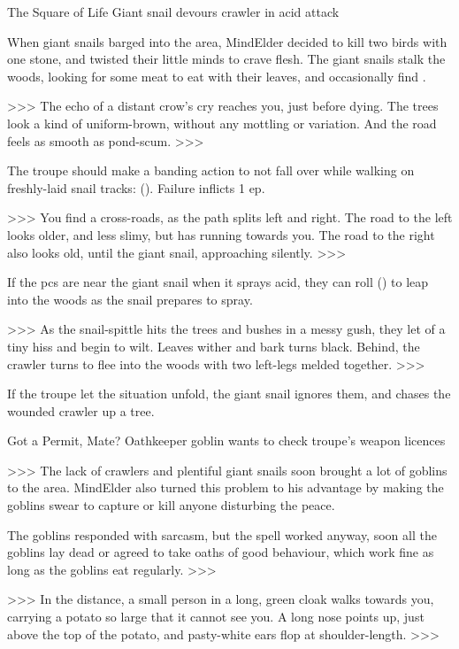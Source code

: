 

{The Square of Life}%
{Giant snail devours \gls{crawler} in acid attack}%

When giant snails barged into the area, \gls{MindElder} decided to kill two birds with one stone, and twisted their little minds to crave flesh.
The giant snails stalk the woods, looking for some meat to eat with their leaves, and occasionally find .

>>>
The echo of a distant crow's cry reaches you, just before dying.
The trees look a kind of uniform-brown, without any mottling or variation.
And the road feels as smooth as pond-scum.
>>>

The troupe should make a banding action to not fall over while walking on freshly-laid snail tracks:  (\tn[7]).
Failure inflicts 1 \gls{ep}.

>>>
You find a cross-roads, as the path splits left and right.
The road to the left looks older, and less slimy, but has  running towards you.
The road to the right also looks old, until the giant snail, approaching silently.
>>>

If the \glspl{pc}  are near the giant snail when it sprays acid, they can roll  (\tn[7]) to leap into the woods as the snail prepares to spray.

>>>
As the snail-spittle hits the trees and bushes in a messy gush, they let of a tiny hiss and begin to wilt.
Leaves wither and bark turns black.
Behind, the \gls{crawler} turns to flee into the woods with two left-legs melded together.
>>>

If the troupe let the situation unfold, the giant snail ignores them, and chases the wounded \gls{crawler} up a tree.


{Got a Permit, Mate?}%
{Oathkeeper goblin wants to check troupe's weapon licences}%

>>>
The lack of \glspl{crawler} and plentiful giant snails soon brought a lot of goblins to the area.
\Gls{MindElder} also turned this problem to his advantage by making the goblins swear to capture or kill anyone disturbing the peace.

The goblins responded with sarcasm, but the spell worked anyway, soon all the goblins lay dead or agreed to take oaths of good behaviour, which work fine as long as the goblins eat regularly.
>>>

>>>
In the distance, a small person in a long, green cloak walks towards you, carrying a potato so large that it cannot see you.
A long nose points up, just above the top of the potato, and pasty-white ears flop at shoulder-length.
>>>


